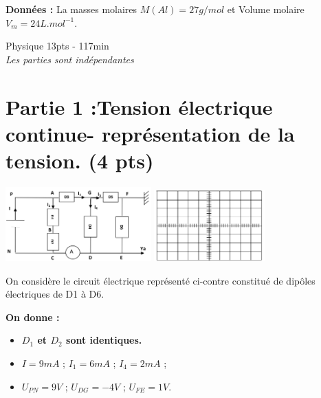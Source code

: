 \documentclass[12pt]{article}
\begin{document}
\textbf{Données : }La masses molaires $M(Al) = 27g/mol$ et Volume molaire $V_m = 24 L.mol^{-1}$.


\begin{center}
    \vspace{0.5cm}
\hrulefill
\Large{Physique 13pts - 117min}
\hrulefill\\
	\emph{Les parties sont indépendantes}
\end{center}

 \section*{Partie 1 :Tension électrique continue- représentation de la tension. \dotfill(4 pts)}
	\begin{center}
	\includegraphics[width=0.42\textwidth]{./img/ex01.png}
	\includegraphics[width=0.32\textwidth]{./img/ex011.png}
\end{center}
On considère le circuit électrique représenté
ci-contre constitué de dipôles
électriques de D1 à D6. 

\textbf{On donne :}

\begin{itemize}
	\item \textbf{ $D_1$ et $D_2$ sont identiques.}

	\item $I = 9 mA$ ; $I_1 = 6 mA$ ; $I_4 = 2 mA$ ;
	\item $U_{PN} = 9V$ ; $U_{DG} = - 4 V$ ; $U_{FE} = 1 V$.
\end{itemize}
\end{document}
